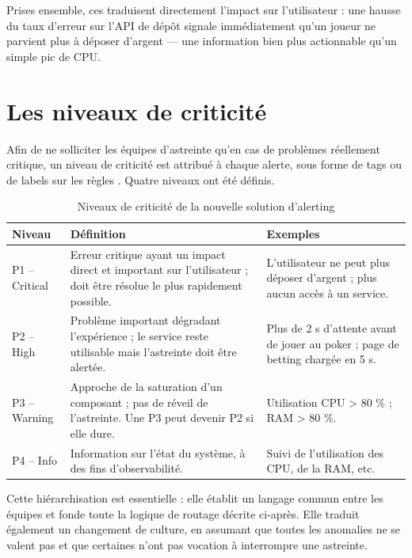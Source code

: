 Prises ensemble, ces  traduisent directement l'impact sur l'utilisateur : une hausse du taux
d'erreur sur l'API de dépôt signale immédiatement qu'un joueur ne parvient plus à déposer d'argent —
une information bien plus actionnable qu'un simple pic de CPU.

\section{Les niveaux de criticité}

Afin de ne solliciter les équipes d'astreinte qu'en cas de problèmes réellement critique, un niveau de
criticité est attribué à chaque alerte, sous forme de tags ou de labels sur les règles . Quatre
niveaux ont été définis.

\begin{table}[h]
	\centering
	\caption{Niveaux de criticité de la nouvelle solution d'alerting}
	\label{tab:niveaux-criticite}
	\begin{tabular}{|p{}|p{}|p{}|}
		\hline
		\textbf{Niveau} & \textbf{Définition} & \textbf{Exemples} \\
		\hline
		P1 -- Critical & Erreur critique ayant un impact direct et important sur l'utilisateur ; doit être résolue le plus rapidement possible. & L'utilisateur ne peut plus déposer d'argent ; plus aucun accès à un service. \\
		\hline
		P2 -- High & Problème important dégradant l'expérience ; le service reste utilisable mais l'astreinte doit être alertée. & Plus de 2 s d'attente avant de jouer au poker ; page de betting chargée en 5 s. \\
		\hline
		P3 -- Warning & Approche de la saturation d'un composant ; pas de réveil de l'astreinte. Une P3 peut devenir P2 si elle dure. & Utilisation CPU > 80 \% ; RAM > 80 \%. \\
		\hline
		P4 -- Info & Information sur l'état du système, à des fins d'observabilité. & Suivi de l'utilisation des CPU, de la RAM, etc. \\
		\hline
	\end{tabular}
\end{table}

Cette hiérarchisation est essentielle : elle établit un langage commun entre les équipes et fonde toute
la logique de routage décrite ci-après. Elle traduit également un changement de culture, en assumant
que toutes les anomalies ne se valent pas et que certaines n'ont pas vocation à interrompre une
astreinte.

